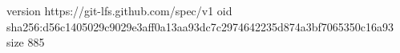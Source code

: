 version https://git-lfs.github.com/spec/v1
oid sha256:d56c1405029c9029e3aff0a13aa93dc7c2974642235d874a3bf7065350c16a93
size 885
